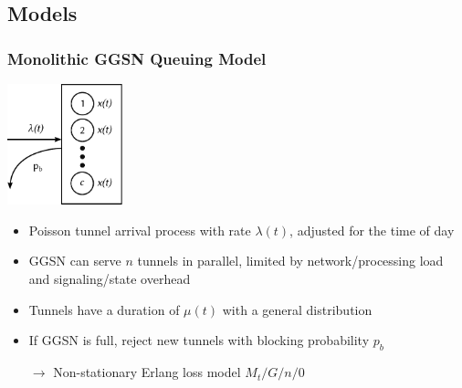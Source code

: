 \documentclass{beamer}
\begin{document}
\subsection{Models}


\begin{frame}
	\frametitle{Monolithic GGSN Queuing Model}
		\begin{center}
			\includegraphics[height=3.5cm]{../../chapters/04-mobilenets/images/ggsn-monolithic.pdf}
		\end{center}

		\begin{itemize}
			\item Poisson tunnel arrival process with rate $\lambda(t)$, adjusted for the time of day
			\item GGSN can serve $n$ tunnels in parallel, limited by network/processing load and signaling/state overhead
			\item Tunnels have a duration of $\mu(t)$ with a general distribution
			\item If GGSN is full, reject new tunnels with blocking probability $p_b$
			\item[$\rightarrow$] Non-stationary Erlang loss model $M_t/G/n/0$ 
		\end{itemize}

\end{frame}
\end{document}
